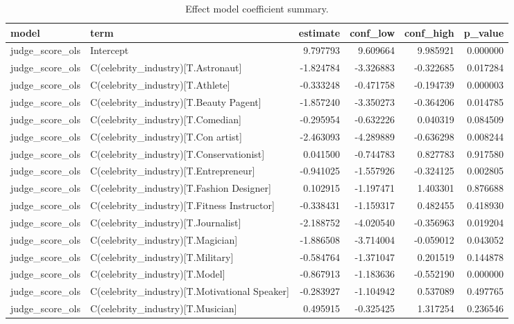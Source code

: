 \begin{table}
\caption{Effect model coefficient summary.}
\begin{tabular}{llrrrr}
\toprule
model & term & estimate & conf\_low & conf\_high & p\_value \\
\midrule
judge\_score\_ols & Intercept & 9.797793 & 9.609664 & 9.985921 & 0.000000 \\
judge\_score\_ols & C(celebrity\_industry)[T.Astronaut] & -1.824784 & -3.326883 & -0.322685 & 0.017284 \\
judge\_score\_ols & C(celebrity\_industry)[T.Athlete] & -0.333248 & -0.471758 & -0.194739 & 0.000003 \\
judge\_score\_ols & C(celebrity\_industry)[T.Beauty Pagent] & -1.857240 & -3.350273 & -0.364206 & 0.014785 \\
judge\_score\_ols & C(celebrity\_industry)[T.Comedian] & -0.295954 & -0.632226 & 0.040319 & 0.084509 \\
judge\_score\_ols & C(celebrity\_industry)[T.Con artist] & -2.463093 & -4.289889 & -0.636298 & 0.008244 \\
judge\_score\_ols & C(celebrity\_industry)[T.Conservationist] & 0.041500 & -0.744783 & 0.827783 & 0.917580 \\
judge\_score\_ols & C(celebrity\_industry)[T.Entrepreneur] & -0.941025 & -1.557926 & -0.324125 & 0.002805 \\
judge\_score\_ols & C(celebrity\_industry)[T.Fashion Designer] & 0.102915 & -1.197471 & 1.403301 & 0.876688 \\
judge\_score\_ols & C(celebrity\_industry)[T.Fitness Instructor] & -0.338431 & -1.159317 & 0.482455 & 0.418930 \\
judge\_score\_ols & C(celebrity\_industry)[T.Journalist] & -2.188752 & -4.020540 & -0.356963 & 0.019204 \\
judge\_score\_ols & C(celebrity\_industry)[T.Magician] & -1.886508 & -3.714004 & -0.059012 & 0.043052 \\
judge\_score\_ols & C(celebrity\_industry)[T.Military] & -0.584764 & -1.371047 & 0.201519 & 0.144878 \\
judge\_score\_ols & C(celebrity\_industry)[T.Model] & -0.867913 & -1.183636 & -0.552190 & 0.000000 \\
judge\_score\_ols & C(celebrity\_industry)[T.Motivational Speaker] & -0.283927 & -1.104942 & 0.537089 & 0.497765 \\
judge\_score\_ols & C(celebrity\_industry)[T.Musician] & 0.495915 & -0.325425 & 1.317254 & 0.236546 \\

\end{tabular}
\end{table}
